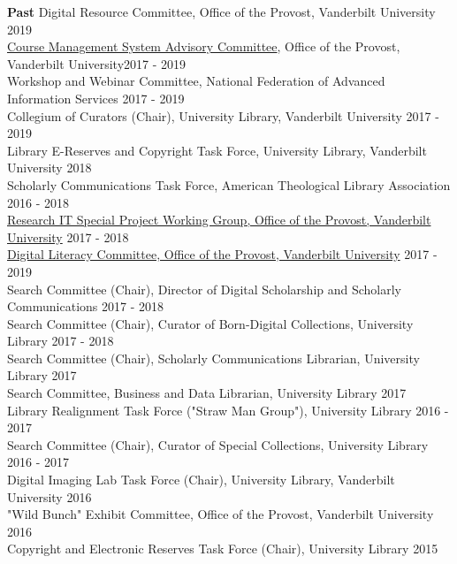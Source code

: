 \documentclass[10pt]{res} %
\begin{document}
\begin{resume}
{\bf Past} 
Digital Resource Committee, Office of the Provost, Vanderbilt University \hfill 2019\\
\href{https://www.vanderbilt.edu/provost/committees/blackboard.php}{Course Management System Advisory Committee}, Office of the Provost, Vanderbilt University\hfill 2017 - 2019\\
Workshop and Webinar Committee, National Federation of Advanced Information Services \hfill 2017 - 2019\\
Collegium of Curators (Chair), University Library, Vanderbilt University  \hfill 2017 - 2019\\
Library E-Reserves and Copyright Task Force, University Library, Vanderbilt University \hfill 2018 \\
Scholarly Communications Task Force, American Theological Library Association \hfill 2016 - 2018 \\
\href{https://news.vanderbilt.edu/2017/03/17/new-working-group-to-assess-and-prioritize-opportunities-for-enhancing-research-it-resources-on-campus/}{Research IT Special Project Working Group, Office of the Provost, Vanderbilt University} \hfill 2017 - 2018 \\
\href{https://www.vanderbilt.edu/ed-tech/committees/digital-literacy-committee.php}{Digital Literacy Committee, Office of the Provost, Vanderbilt University} \hfill 2017 - 2019\\
Search Committee (Chair), Director of Digital Scholarship and Scholarly Communications \hfill 2017 - 2018 \\
Search Committee (Chair), Curator of Born-Digital Collections, University Library \hfill 2017 - 2018 \\
Search Committee (Chair), Scholarly Communications Librarian, University Library \hfill 2017 \\
Search Committee, Business and Data Librarian, University Library \hfill 2017 \\
Library Realignment Task Force ("Straw Man Group"), University Library \hfill 2016 - 2017 \\
Search Committee (Chair), Curator of Special Collections, University Library \hfill 2016 - 2017 \\
Digital Imaging Lab Task Force (Chair), University Library, Vanderbilt University \hfill 2016 \\
"Wild Bunch" Exhibit Committee, Office of the Provost, Vanderbilt University \hfill 2016 \\
Copyright and Electronic Reserves Task Force (Chair), University Library \hfill 2015 \\

\end{resume}
\end{document}
